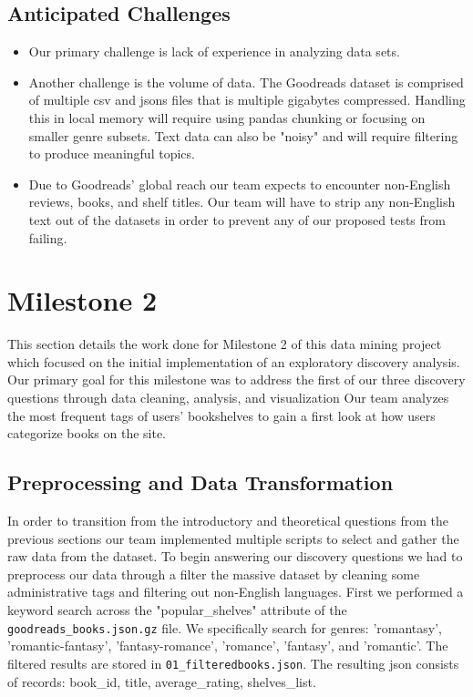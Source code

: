 \documentclass[conference]{IEEEtran}
\begin{document}
\subsection{Anticipated Challenges}
\begin{itemize}
    \item   Our primary challenge is lack of experience in analyzing data sets.
    \item Another challenge is the volume of data. The Goodreads dataset is comprised of multiple csv and jsons files that is multiple gigabytes compressed. Handling this in local memory will require using pandas chunking or focusing on smaller genre subsets. Text data can also be "noisy" and will require filtering to produce meaningful topics.
    \item Due to Goodreads' global reach our team expects to encounter non-English reviews, books, and shelf titles. Our team will have to strip any non-English text out of the datasets in order to prevent any of our proposed tests from failing.
\end{itemize}

\section{Milestone 2}

This section details the work done for Milestone 2 of this data mining project which focused on the initial implementation of an exploratory discovery analysis. Our primary goal for this milestone was to address the first of our three discovery questions through data cleaning, analysis, and visualization Our team analyzes the most frequent tags of users' bookshelves to gain a first look at how users categorize books on the site.


\subsection{Preprocessing and Data Transformation}

In order to transition from the introductory and theoretical questions from the previous sections our team implemented multiple scripts to select and gather the raw data from the dataset.
 To begin answering our discovery questions we had to preprocess our data through a filter the massive dataset by cleaning some administrative tags and filtering out non-English languages. First we performed a keyword search across the "popular\_shelves" attribute of the \texttt{goodreads\_books.json.gz} file. We specifically search for genres: 'romantasy', 'romantic-fantasy', 'fantasy-romance', 'romance', 'fantasy', and 'romantic'. The filtered results are stored in \texttt{01\_filteredbooks.json}. The resulting json consists of records: book\_id, title, average\_rating, shelves\_list.
\end{document}
